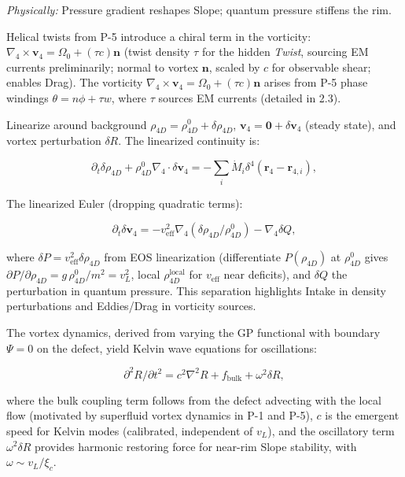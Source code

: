 \textit{Physically:} Pressure gradient reshapes Slope; quantum pressure stiffens the rim.

Helical twists from P-5 introduce a chiral term in the vorticity: $\nabla_4 \times \mathbf{v}_4 = \Omega_0 + (\tau c) \mathbf{n}$ (twist density $\tau$ for the hidden \emph{Twist}, sourcing EM currents preliminarily; normal to vortex $\mathbf{n}$, scaled by $c$ for observable shear; enables Drag). The vorticity $\nabla_4 \times \mathbf{v}_4 = \Omega_0 + (\tau c) \mathbf{n}$ arises from P-5 phase windings $\theta = n\phi + \tau w$, where $\tau$ sources EM currents (detailed in 2.3).

Linearize around background $\rho_{4D} = \rho_{4D}^0 + \delta \rho_{4D}$, $\mathbf{v}_4 = \mathbf{0} + \delta \mathbf{v}_4$ (steady state), and vortex perturbation $\delta R$. The linearized continuity is:

\begin{equation}
\partial_t \delta \rho_{4D} + \rho_{4D}^0 \nabla_4 \cdot \delta \mathbf{v}_4 = -\sum_i \dot{M}_i \delta^4(\mathbf{r}_4 - \mathbf{r}_{4,i}),
\end{equation}

The linearized Euler (dropping quadratic terms):

\begin{equation}
\partial_t \delta \mathbf{v}_4 = -v_{\text{eff}}^2 \nabla_4 (\delta \rho_{4D} / \rho_{4D}^0) - \nabla_4 \delta Q,
\end{equation}

where $\delta P = v_{\text{eff}}^2 \delta \rho_{4D}$ from EOS linearization (differentiate $P(\rho_{4D})$ at $\rho_{4D}^0$ gives $\partial P / \partial \rho_{4D} = g \, \rho_{4D}^0 / m^{2} = v_L^2$, local $\rho_{4D}^{\text{local}}$ for $v_{\text{eff}}$ near deficits), and $\delta Q$ the perturbation in quantum pressure. This separation highlights Intake in density perturbations and Eddies/Drag in vorticity sources.

The vortex dynamics, derived from varying the GP functional with boundary $\Psi=0$ on the defect, yield Kelvin wave equations for oscillations:

\begin{equation}
\partial^2 R / \partial t^2 = c^2 \nabla^2 R + f_{\text{bulk}} + \omega^2 \delta R,
\end{equation}

where the bulk coupling term follows from the defect advecting with the local flow (motivated by superfluid vortex dynamics in P-1 and P-5), $c$ is the emergent speed for Kelvin modes (calibrated, independent of $v_L$), and the oscillatory term $\omega^2 \delta R$ provides harmonic restoring force for near-rim Slope stability, with $\omega \sim v_L / \xi_c$.

